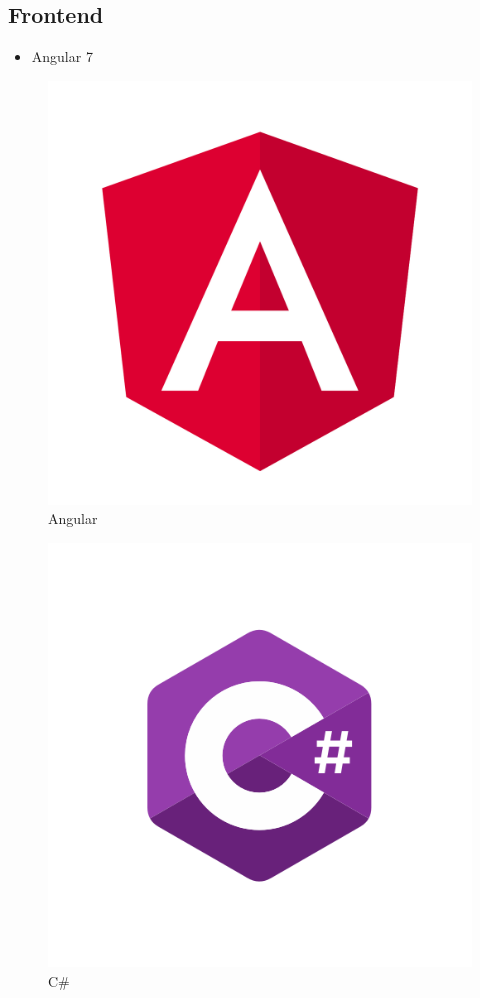 \documentclass[a4paper, titlepage]{article}
\begin{document}
    \subsection{Frontend}
    \begin{itemize}
    \item Angular 7
    \end{itemize}
    \begin{figure}
        \includegraphics[width=\textwidth]{angular}
        \caption{Angular}
    \end{figure}
    \begin{figure}
        \includegraphics[width=\textwidth]{csharp}
        \caption{C\#}
    \end{figure}

    \newpage
    \printbibliography
\end{document}
